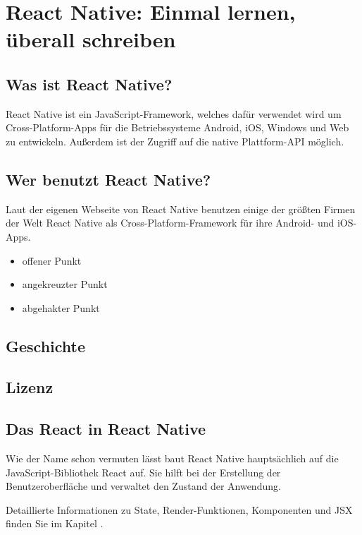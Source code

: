 \section{React Native: Einmal lernen, überall schreiben}
\label{reactnative}

\subsection{Was ist React Native?}
React Native ist ein JavaScript-Framework, welches dafür verwendet wird um Cross-Platform-Apps für
die Betriebssysteme Android, iOS, Windows und Web zu entwickeln.
Außerdem ist der Zugriff auf die native Plattform-API möglich.

\subsection{Wer benutzt React Native?}
Laut der eigenen Webseite von React Native benutzen einige der größten Firmen der Welt React Native
als Cross-Platform-Framework für ihre Android- und iOS-Apps.

\begin{itemize}
  \item[\Square] offener Punkt
  \item[\XBox] angekreuzter Punkt
  \item[\CheckedBox] abgehakter Punkt
\end{itemize}

\cite{reactNativeShowcase}

\subsection{Geschichte}

\subsection{Lizenz}

\subsection{Das React in React Native}
Wie der Name schon vermuten lässt baut React Native hauptsächlich auf die JavaScript-Bibliothek
React auf. Sie hilft bei der Erstellung der Benutzeroberfläche und verwaltet den Zustand der
Anwendung.

Detaillierte Informationen zu State, Render-Funktionen, Komponenten und JSX finden Sie im Kapitel
.

